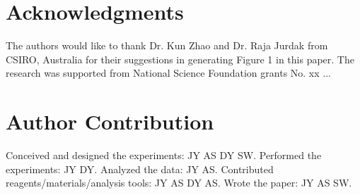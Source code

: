 \documentclass[10pt,letterpaper]{article}
\begin{document}
\section*{Acknowledgments}
The authors would like to thank Dr. Kun Zhao and Dr. Raja Jurdak from CSIRO, Australia for their suggestions in generating Figure 1 in this paper. 
The research was supported from National Science Foundation grants No. xx ...

\section*{Author Contribution}
Conceived and designed the experiments: JY AS DY SW. Performed the experiments: JY DY. Analyzed the data: JY AS. Contributed reagents/materials/analysis tools: JY AS DY AS. Wrote the paper: JY AS SW.

\nolinenumbers
\end{document}
